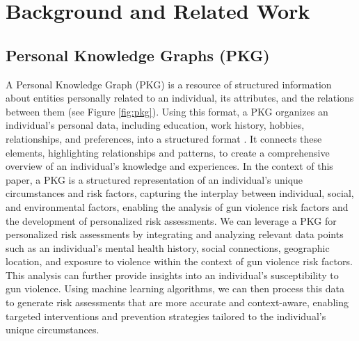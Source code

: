 \documentclass[11pt]{article}
\begin{document}
\section{Background and Related Work}\label{sec:background}
\subsection{Personal Knowledge Graphs (PKG)}
A Personal Knowledge Graph (PKG) is a resource of structured information about entities personally related to an individual, its attributes, and the relations between them \cite{balog2019personal} (see Figure \ref{fig:pkg}). Using this format, a PKG organizes an individual's personal data, including education, work history, hobbies, relationships, and preferences, into a structured format \cite{rastogi2020personal}. It connects these elements, highlighting relationships and patterns, to create a comprehensive overview of an individual's knowledge and experiences. In the context of this paper, a PKG is a structured representation of an individual's unique circumstances and risk factors, capturing the interplay between individual, social, and environmental factors, enabling the analysis of gun violence risk factors and the development of personalized risk assessments. We can leverage a PKG for personalized risk assessments by integrating and analyzing relevant data points such as an individual's mental health history, social connections, geographic location, and exposure to violence \cite{rastogi2020personal} within the context of gun violence risk factors. This analysis can further provide insights into an individual's susceptibility to gun violence. Using machine learning algorithms, we can then process this data to generate risk assessments that are more accurate and context-aware, enabling targeted interventions and prevention strategies tailored to the individual's unique circumstances.
\end{document}
